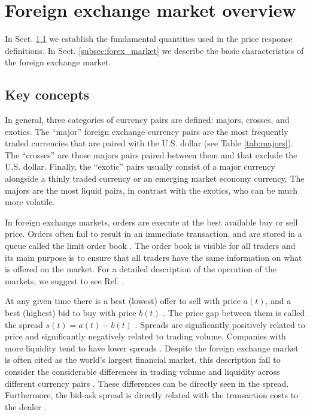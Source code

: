 \section{Foreign exchange market overview}\label{sec:forex_overview}

In Sect. \ref{subsec:key_concepts} we establish the fundamental quantities used
in the price response definitions. In Sect. \ref{subsec:forex_market} we
describe the basic characteristics of the foreign exchange market.

\subsection{Key concepts}\label{subsec:key_concepts}

In general, three categories of currency pairs are defined: majors, crosses,
and exotics. The ``major'' foreign exchange currency pairs are the most
frequently traded currencies that are paired with the U.S. dollar (see Table
\ref{tab:majors}). The ``crosses'' are those majors pairs paired between them
and that exclude the U.S. dollar. Finally, the ``exotic'' pairs usually consist
of a major currency alongside a thinly traded currency or an emerging market
economy currency. The majors are the most liquid pairs, in contrast with the
exotics, who can be much more volatile.

In foreign exchange markets, orders are execute at the best available buy or
sell price. Orders often fail to result in an immediate transaction, and are
stored in a queue called the limit order book
\cite{forex_market_micro,forex_structure,stat_prop,predictive_pow,intro_market_micro,prop_order_book}.
The order book is visible for all traders and its main purpose is to ensure
that all traders have the same information on what is offered on the market.
For a detailed description of the operation of the markets, we suggest to see
Ref. \cite{my_paper_response_financial}.

At any given time there is a best (lowest) offer to sell with price
$a\left(t\right)$, and a best (highest) bid to buy with price $b\left(t\right)$
\cite{subtle_nature,prop_order_book,account_spread,limit_ord_spread,stat_theory}.
The price gap between them is called the spread
$s\left(t\right) = a\left(t\right)-b\left(t\right)$
\cite{teach_spread,subtle_nature,Bouchaud_2004,large_prices_changes,market_digest,account_spread,stat_theory,em_stylized_facts}.
Spreads are significantly positively related to price and significantly
negatively related to trading volume. Companies with more liquidity tend to
have lower spreads
\cite{components_spread_tokyo,account_spread,effects_spread,components_spread}.
Despite the foreign exchange market is often cited as the world's largest
financial market, this description fail to consider the considerable differences
in trading volume and liquidity across different currency pairs
\cite{forex_microstructure}. These differences can be directly seen in the
spread. Furthermore, the bid-ask spread is directly related with the
transaction costs to the dealer \cite{teach_spread,spread_futures}.

